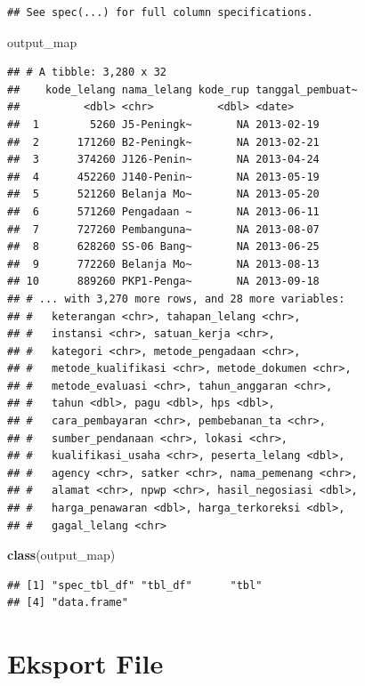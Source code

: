 \documentclass[]{book}
\newenvironment{Shaded}{\begin{snugshade}}{\end{snugshade}}
\newcommand{\KeywordTok}[1]{\textcolor[rgb]{0.13,0.29,0.53}{\textbf{#1}}}
\newcommand{\NormalTok}[1]{#1}
\begin{document}
\begin{verbatim}
## See spec(...) for full column specifications.
\end{verbatim}

\begin{Shaded}
\begin{Highlighting}[]
\NormalTok{output_map}
\end{Highlighting}
\end{Shaded}

\begin{verbatim}
## # A tibble: 3,280 x 32
##    kode_lelang nama_lelang kode_rup tanggal_pembuat~
##          <dbl> <chr>          <dbl> <date>          
##  1        5260 J5-Peningk~       NA 2013-02-19      
##  2      171260 B2-Peningk~       NA 2013-02-21      
##  3      374260 J126-Penin~       NA 2013-04-24      
##  4      452260 J140-Penin~       NA 2013-05-19      
##  5      521260 Belanja Mo~       NA 2013-05-20      
##  6      571260 Pengadaan ~       NA 2013-06-11      
##  7      727260 Pembanguna~       NA 2013-08-07      
##  8      628260 SS-06 Bang~       NA 2013-06-25      
##  9      772260 Belanja Mo~       NA 2013-08-13      
## 10      889260 PKP1-Penga~       NA 2013-09-18      
## # ... with 3,270 more rows, and 28 more variables:
## #   keterangan <chr>, tahapan_lelang <chr>,
## #   instansi <chr>, satuan_kerja <chr>,
## #   kategori <chr>, metode_pengadaan <chr>,
## #   metode_kualifikasi <chr>, metode_dokumen <chr>,
## #   metode_evaluasi <chr>, tahun_anggaran <chr>,
## #   tahun <dbl>, pagu <dbl>, hps <dbl>,
## #   cara_pembayaran <chr>, pembebanan_ta <chr>,
## #   sumber_pendanaan <chr>, lokasi <chr>,
## #   kualifikasi_usaha <chr>, peserta_lelang <dbl>,
## #   agency <chr>, satker <chr>, nama_pemenang <chr>,
## #   alamat <chr>, npwp <chr>, hasil_negosiasi <dbl>,
## #   harga_penawaran <dbl>, harga_terkoreksi <dbl>,
## #   gagal_lelang <chr>
\end{verbatim}

\begin{Shaded}
\begin{Highlighting}[]
\KeywordTok{class}\NormalTok{(output_map)}
\end{Highlighting}
\end{Shaded}

\begin{verbatim}
## [1] "spec_tbl_df" "tbl_df"      "tbl"        
## [4] "data.frame"
\end{verbatim}

\section{Eksport File}\label{eksport-file}
\end{document}
